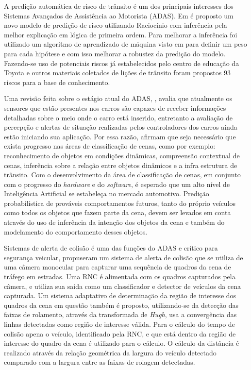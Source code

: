 \documentclass[
	12pt,				%
    oneside,			%
	a4paper,			%
	english,			%
	french,				%
	spanish,			%
	brazil,				%
	]{abntex2}
\begin{document}
A predição automática de risco de trânsito é um dos principais interesses dos Sistemas Avançados de Assistência ao Motorista (ADAS). Em  é proposto um novo modelo de predição de risco utilizando Raciocínio com inferência pela melhor explicação em lógica de primeira ordem. Para melhorar a inferência foi utilizado um algoritmo de aprendizado de máquina visto em  para definir um peso para cada hipótese e com isso melhorar a robustez da predição do modelo. Fazendo-se uso de potenciais riscos já estabelecidos pelo centro de educação da Toyota e outros materiais coletados de lições de trânsito foram propostos 93 riscos para a base de conhecimento.

Uma revisão feita sobre o estágio atual do ADAS, , avalia que atualmente os sensores que estão presentes nos carros são capazes de receber informações detalhadas sobre o meio onde o carro está inserido, entretanto a avaliação de percepção e alertas de situação realizadas pelos controladores dos carros ainda estão iniciando sua aplicação. Por essa razão, afirmam que seja necessário que exista progresso nas áreas de classificação de cenas, como por exemplo: reconhecimento de objetos em condições dinâmicas, compreensão contextual de cenas, inferência sobre a relação entre objetos dinâmicos e a infra estrutura de trânsito. Com o desenvolvimento da área de classificação de cenas, em conjunto com o progresso do \textit{hardware} e do \textit{software}, é esperado que um alto nível de Inteligência Artificial se estabeleça no mercado automotivo. Predição probabilística de prováveis comportamentos futuros, tanto do próprio veículos como todos os objetos que fazem parte da cena, devem ser levados em conta através do uso de inferência da intenção dos objetos da cena e também do modelamento do comportamento desses objetos.

Sistemas de alerta de colisão é uma das funções do ADAS e crítico para segurança veicular,  propuseram um sistema de alerta de colisão que se utiliza de uma câmera monocular para capturar uma sequência de quadros da cena de tráfego em estradas. Uma RNC é alimentada com os quadros capturados pela câmera, e utiliza sua saída como um classificador e detector de veículos da cena capturada. Um sistema adaptativo de determinação da região de interesse dos quadros da cena em questão também é proposto, utilizando-se da detecção das faixas de rolamento, através da transformada de \textit{Hugh}, usa a convergência das linhas detectadas como região de interesse válida. Para o cálculo do tempo de colisão apena o veículo, identificado pela RNC, e que está dentro da região de interesse do quadro da cena é utilizado para o cálculo. O cálculo da distância é realizado através da relação geométrica da largura do veículo detectado comparado com a largura entre as faixas de rolagem detectadas.
\end{document}
